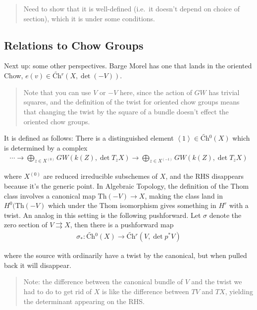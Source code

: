 \begin{quote}
Need to show that it is well-defined (i.e.~it doesn't depend on choice
of section), which it is under some conditions.
\end{quote}

\hypertarget{relations-to-chow-groups}{%
\subsection{Relations to Chow Groups}\label{relations-to-chow-groups}}

Next up: some other perspectives. Barge Morel has one that lands in the
oriented Chow, \(e(v) \in \widetilde{\text{Ch}}{}^r(X, \det (-V))\).

\begin{quote}
Note that you can use \(V\) or \(-V\) here, since the action of \(GW\)
has trivial squares, and the definition of the twist for oriented chow
groups means that changing the twist by the square of a bundle doesn't
effect the oriented chow groups.
\end{quote}

It is defined as follows: There is a distinguished element
\(\left\langle{1}\right\rangle\in \widetilde{\text{Ch}}{}^0(X)\) which
is determined by a complex
\begin{align*}
\cdots \to \bigoplus_{z\in X^{(0)}} GW(k(Z), \det T_zX) \to \bigoplus_{z\in X^{(-1)}} GW(k(Z), \det T_zX)
\end{align*}

where \(X^{(0)}\) are reduced irreducible subschemes of \(X\), and the
RHS disappears because it's the generic point. In Algebraic Topology,
the definition of the Thom class involves a canonical map
\(\text{Th}(-V)\to X\), making the class land in \(H^0(\text{Th}(-V)\)
which under the Thom isomorphism gives something in \(H^r\) with a
twist. An analog in this setting is the following pushforward. Let
\(\sigma\) denote the zero section of \(V\rightrightarrows X\), then
there is a pushforward map
\begin{align*}
\sigma_*: \widetilde{\text{Ch}}{}^0(X) \to \widetilde{\text{Ch}}{}^r(V, \det p^* V)
\end{align*}

where the source with ordinarily have a twist by the canonical, but when
pulled back it will disappear.

\begin{quote}
Note: the difference between the canonical bundle of \(V\) and the twist
we had to do to get rid of \(X\) is like the difference between \(TV\)
and \(TX\), yielding the determinant appearing on the RHS.
\end{quote}

